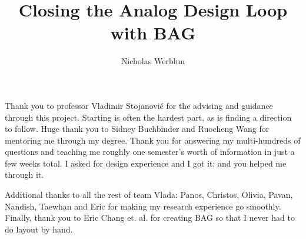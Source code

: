 \documentclass[masters]{ucbthesis}
\begin{document}

\title{Closing the Analog Design Loop with BAG}
\author{Nicholas Werblun}


\maketitle
\copyrightpage



\begin{frontmatter}



\tableofcontents
\clearpage
\listoffigures
\clearpage
\listoftables

\begin{acknowledgements}
Thank you to professor Vladimir Stojanovi\'c for the advising and guidance through this project. Starting is often the hardest part, as is finding a direction to follow. Huge thank you to Sidney Buchbinder and Ruocheng Wang for mentoring me through my degree. Thank you for answering my multi-hundreds of questions and teaching me roughly one semester's worth of information in just a few weeks total.  I asked for design experience and I got it; and you helped me through it.

Additional thanks to all the rest of team Vlada: Panos, Christos, Olivia, Pavan, Nandish, Taewhan and Eric for making my research experience go smoothly. Finally, thank you to Eric Chang et. al. for creating BAG so that I never had to do layout by hand.

\end{acknowledgements}

\end{frontmatter}
\pagestyle{headings}
\end{document}
